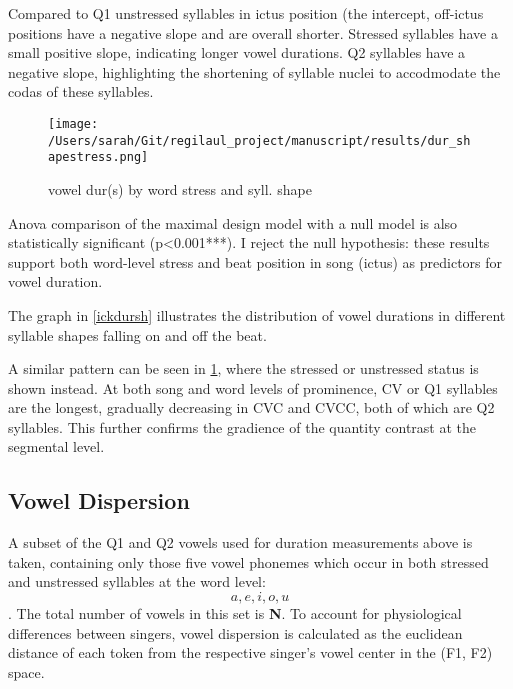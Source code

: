 Compared to Q1 unstressed syllables in ictus position (the intercept,  off-ictus positions have a negative slope and are overall shorter. Stressed syllables have a small positive slope, indicating longer vowel durations. Q2 syllables have a negative slope, highlighting the shortening of syllable nuclei to accodmodate the codas of these syllables. 


\begin{figure}[htbp]
\centering
\texttt{[image: /Users/sarah/Git/regilaul\_project/manuscript/results/dur\_shapestress.png]}
\caption{vowel dur(s) by word stress and syll. shape}
\label{strdursh}

\end{figure}
Anova comparison of the maximal design model with a null model is also statistically significant (p<0.001***). I reject the null hypothesis: these results support both word-level stress and beat position in song (ictus) as predictors for vowel duration. 

The graph in \ref{ickdursh} illustrates the distribution of vowel durations in different syllable shapes falling on and off the beat. 

A similar pattern can be seen in \ref{strdursh}, where the stressed or unstressed status is shown instead. At both song and word levels of prominence, CV or Q1 syllables are the longest, gradually decreasing in CVC and CVCC, both of which are Q2 syllables.  This further confirms the gradience of the quantity contrast at the segmental level. 




%

\subsection{Vowel Dispersion}
A subset of the Q1 and Q2 vowels used for duration measurements above is taken,  containing only those five vowel phonemes which occur in both stressed and unstressed syllables at the word level: \[a, e, i, o, u\]. The total number of vowels in this set is {\bf N}.
To account for physiological differences between singers, vowel dispersion is calculated as the euclidean distance of each token from the respective singer's vowel center in the (F1, F2) space. 


